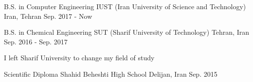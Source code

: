 

\begin{cventries}

  \cventry
    {B.S. in Computer Engineering} %
    {IUST (Iran University of Science and Technology)} %
    {Iran, Tehran} %
    {Sep. 2017 - Now} %
    {
    }

  \cventry
    {B.S. in Chemical Engineering} %
    {SUT (Sharif University of Technology)} %
    {Tehran, Iran} %
    {Sep. 2016 - Sep. 2017} %
    {
      \begin{cvitems} %
        \item {I left Sharif University to change my field of study}
      \end{cvitems}
    }

    \cventry
    {Scientific Diploma} %
    {Shahid ‌Beheshti High School} %
    {Delijan, Iran} %
    {Sep. 2015} %
    {
    }

\end{cventries}
